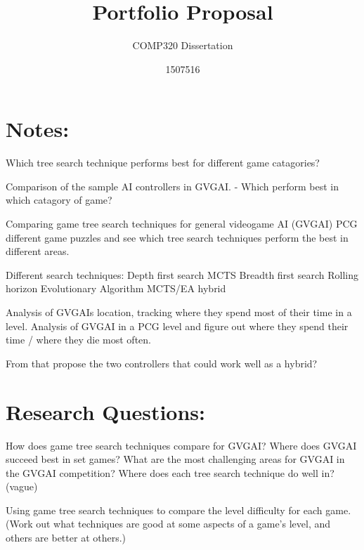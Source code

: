 \documentclass{scrartcl}
\title{Portfolio Proposal}
\subtitle{COMP320 Dissertation}
\author{1507516}
\begin{document}
\maketitle

\abstract{}

\section{Notes:}
Which tree search technique performs best for different game catagories?

Comparison of the sample AI controllers in GVGAI. - Which perform best in which catagory of game?

Comparing game tree search techniques for general videogame AI (GVGAI)
PCG different game puzzles and see which tree search techniques perform the best in different areas.

Different search techniques:
Depth first search
MCTS
Breadth first search
Rolling horizon Evolutionary Algorithm 
MCTS/EA hybrid


Analysis of GVGAIs location, tracking where they spend most of their time in a level.
Analysis of GVGAI in a PCG level and figure out where they spend their time / where they die most often.

From that propose the two controllers that could work well as a hybrid?


\section{Research Questions:}
How does game tree search techniques compare for GVGAI?
Where does GVGAI succeed best in set games?
What are the most challenging areas for GVGAI in the GVGAI competition?
Where does each tree search technique do well in?(vague) 

Using game tree search techniques to compare the level difficulty for each game.
(Work out what techniques are good at some aspects of a game's level, and others are better at others.)
\end{document}

